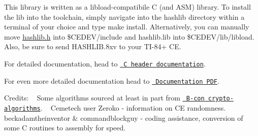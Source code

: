 This library is written as a libload-\/compatibile C (and ASM) library. To install the lib into the toolchain, simply navigate into the hashlib directory within a terminal of your choice and type {\ttfamily make install}. Alternatively, you can manually move {\ttfamily \mbox{\hyperlink{hashlib_8h}{hashlib.\+h}}} into {\ttfamily \$\+CEDEV/include} and {\ttfamily hashlib.\+lib} into {\ttfamily \$\+CEDEV/lib/libload}. Also, be sure to send {\ttfamily HASHLIB.\+8xv} to your TI-\/84+ CE.

For detailed documentation, head to \href{https://acagliano.github.io/hashlib/html/}{\texttt{ C header documentation}}.

For even more detailed documentation head to \href{https://github.com/acagliano/hashlib/blob/stable/Hashlib\%20Documentation.pdf}{\texttt{ Documentation PDF}}.

Credits\+: ~\newline
 Some algorithms sourced at least in part from \href{https://github.com/B-Con/crypto-algorithms}{\texttt{ B-\/con crypto-\/algorithms}}. ~\newline
 Cemetech user Zeroko -\/ information on CE randomness. ~\newline
 beckadamtheinventor \& commandblockguy -\/ coding assistance, conversion of some C routines to assembly for speed. ~\newline
 